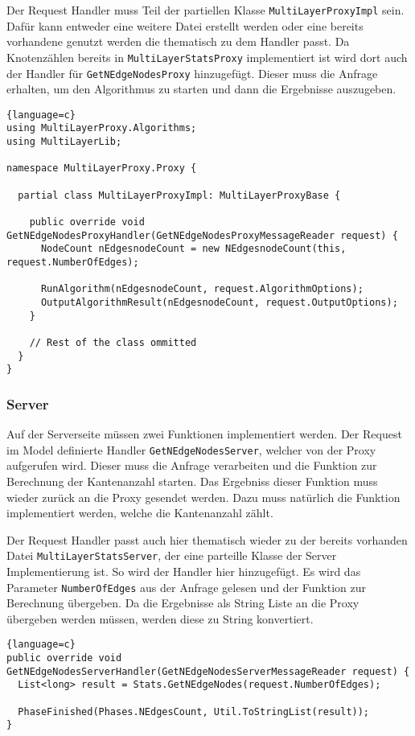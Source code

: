 Der Request Handler muss Teil der partiellen Klasse \verb|MultiLayerProxyImpl| sein. Dafür kann entweder eine weitere Datei erstellt werden oder eine bereits vorhandene genutzt werden die thematisch zu dem Handler passt.
Da Knotenzählen bereits in \verb|MultiLayerStatsProxy| implementiert ist wird dort auch der Handler für \verb|GetNEdgeNodesProxy| hinzugefügt. Dieser muss die Anfrage erhalten, um den Algorithmus zu starten und dann die Ergebnisse auszugeben.

\begin{lstlisting}{language=c}
using MultiLayerProxy.Algorithms;
using MultiLayerLib;

namespace MultiLayerProxy.Proxy {

  partial class MultiLayerProxyImpl: MultiLayerProxyBase {

    public override void GetNEdgeNodesProxyHandler(GetNEdgeNodesProxyMessageReader request) {
      NodeCount nEdgesnodeCount = new NEdgesnodeCount(this, request.NumberOfEdges);

      RunAlgorithm(nEdgesnodeCount, request.AlgorithmOptions);
      OutputAlgorithmResult(nEdgesnodeCount, request.OutputOptions);
    }
  
    // Rest of the class ommitted
  }
}
\end{lstlisting}



\subsubsection{Server}

Auf der Serverseite müssen zwei Funktionen implementiert werden. Der Request im Model definierte Handler \verb|GetNEdgeNodesServer|, welcher von der Proxy aufgerufen wird. Dieser muss die Anfrage verarbeiten und die Funktion zur Berechnung der Kantenanzahl starten. Das Ergebniss dieser Funktion muss wieder zurück an die Proxy gesendet werden.
Dazu muss natürlich die Funktion implementiert werden, welche die Kantenanzahl zählt.

Der Request Handler passt auch hier thematisch wieder zu der bereits vorhanden Datei \verb|MultiLayerStatsServer|, der eine parteille Klasse der Server Implementierung ist. So wird der Handler hier hinzugefügt.
Es wird das Parameter \verb|NumberOfEdges| aus der Anfrage gelesen und der Funktion zur Berechnung übergeben. Da die Ergebnisse als String Liste an die Proxy übergeben werden müssen, werden diese zu String konvertiert.


\begin{lstlisting}{language=c}
public override void GetNEdgeNodesServerHandler(GetNEdgeNodesServerMessageReader request) {
  List<long> result = Stats.GetNEdgeNodes(request.NumberOfEdges);

  PhaseFinished(Phases.NEdgesCount, Util.ToStringList(result));
}
\end{lstlisting}

